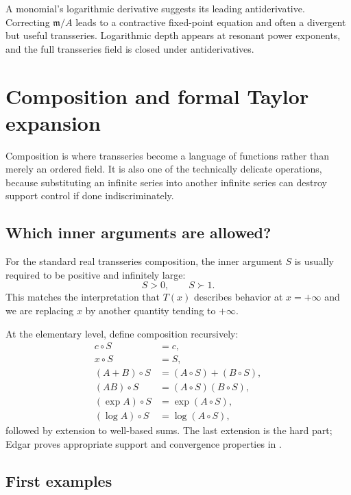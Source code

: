 \documentclass[11pt,openany]{book}
\theoremstyle{definition}
\theoremstyle{plain}
\theoremstyle{remark}
\newcommand{\m}{\mathfrak{m}}
\newcommand{\succdom}{\succ}
\begin{document}
\begin{summarybox}
A monomial's logarithmic derivative suggests its leading antiderivative. Correcting $\m/A$ leads to a contractive fixed-point equation and often a divergent but useful transseries. Logarithmic depth appears at resonant power exponents, and the full transseries field is closed under antiderivatives.
\end{summarybox}


\chapter{Composition and formal Taylor expansion}\label{ch:composition}

Composition is where transseries become a language of functions rather than merely an ordered field. It is also one of the technically delicate operations, because substituting an infinite series into another infinite series can destroy support control if done indiscriminately.

\section{Which inner arguments are allowed?}

For the standard real transseries composition, the inner argument $S$ is usually required to be positive and infinitely large:
\[
 S>0,
 \qquad S\succdom1.
\]
This matches the interpretation that $T(x)$ describes behavior at $x=+\infty$ and we are replacing $x$ by another quantity tending to $+\infty$.

At the elementary level, define composition recursively:
\begin{align*}
 c\circ S&=c,\\
 x\circ S&=S,\\
 (A+B)\circ S&=(A\circ S)+(B\circ S),\\
 (AB)\circ S&=(A\circ S)(B\circ S),\\
 (\exp A)\circ S&=\exp(A\circ S),\\
 (\log A)\circ S&=\log(A\circ S),
\end{align*}
followed by extension to well-based sums. The last extension is the hard part; Edgar proves appropriate support and convergence properties in \cite{edgar-composition}.

\section{First examples}
\end{document}
